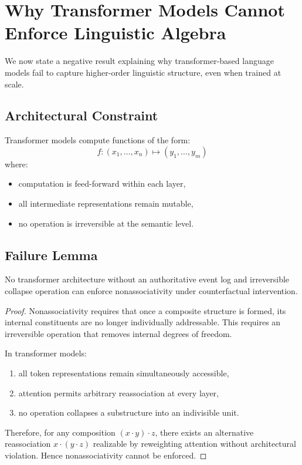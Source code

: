 \documentclass[11pt]{article}
\begin{document}
\section{Why Transformer Models Cannot Enforce Linguistic Algebra}
\label{sec:transformer_failure}

We now state a negative result explaining why transformer-based language models fail to capture higher-order linguistic structure, even when trained at scale.

\subsection{Architectural Constraint}

Transformer models compute functions of the form:
\[
f : (x_1,\dots,x_n) \mapsto (y_1,\dots,y_m)
\]
where:
\begin{itemize}
  \item computation is feed-forward within each layer,
  \item all intermediate representations remain mutable,
  \item no operation is irreversible at the semantic level.
\end{itemize}

\subsection{Failure Lemma}

\begin{lemma}
\label{lem:no_commit}
No transformer architecture without an authoritative event log and irreversible collapse operation can enforce nonassociativity under counterfactual intervention.
\end{lemma}

\begin{proof}
Nonassociativity requires that once a composite structure is formed, its internal constituents are no longer individually addressable. This requires an irreversible operation that removes internal degrees of freedom.

In transformer models:
\begin{enumerate}
  \item all token representations remain simultaneously accessible,
  \item attention permits arbitrary reassociation at every layer,
  \item no operation collapses a substructure into an indivisible unit.
\end{enumerate}

Therefore, for any composition $(x \cdot y) \cdot z$, there exists an alternative reassociation $x \cdot (y \cdot z)$ realizable by reweighting attention without architectural violation. Hence nonassociativity cannot be enforced.
\end{proof}
\end{document}
